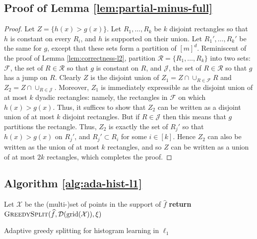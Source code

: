 \documentclass[final,12pt]{colt2018} %
\newcommand{\rect}{\mathcal{R}}
\newcommand{\hier}{\mathcal{D}}
\newcommand{\calF}{\mathcal{F}}
\newcommand{\calJ}{\mathcal{J}}
\newcommand{\calX}{\mathcal{X}}
\newcommand{\fhat}{\widehat{f}}
\newcommand{\grid}{\mathrm{grid}}
\begin{document}
\subsection{Proof of Lemma \ref{lem:partial-minus-full}}
\begin{proof}
Let $Z = \{h(x) > g(x)\}$.
Let $R_1, \ldots, R_k$ be $k$ disjoint rectangles so that $h$ is constant on every $R_i$, and $h$ is supported on their union.
Let $R_1', \ldots, R_k'$ be the same for $g$, except that these sets form a partition of $[m]^d$.
Reminiscent of the proof of Lemma \ref{lem:correctness-l2}, partition $\rect = \{R_1, \ldots, R_k \}$ into two sets: $\calF$, the set of $R \in \rect$ so that $g$ is constant on $R$, and $\calJ$, the set of $R \in \rect$ so that $g$ has a jump on $R$.
Clearly $Z$ is the disjoint union of $Z_1 = Z \cap \cup_{R \in \calF} R$ and $Z_2 = Z \cap \cup_{R \in \calJ}$.
Moreover, $Z_1$ is immediately expressible as the disjoint union of at most $k$ dyadic rectangles: namely, the rectangles in $\calF$ on which $h(x) > g(x)$.
Thus, it suffices to show that $Z_2$ can be written as a disjoint union of at most $k$ disjoint rectangles.
But if $R \in \calJ$ then this means that $g$ partitions the rectangle.
Thus, $Z_2$ is exactly the set of $R_j'$ so that $h(x) > g(x)$ on $R_j'$, and $R_j' \subset R_i$ for some $i \in [k]$.
Hence $Z_2$ can also be written as the union of at most $k$ rectangles, and so $Z$ can be written as a union of at most $2k$ rectangles, which completes the proof.
%
\end{proof}

\subsection{Algorithm \ref{alg:ada-hist-l1}}
\begin{algorithm}[htb]
\begin{algorithmic}[1]
\Function{AdaptiveGreedySplit}{$\fhat, \xi$}
\State Let $\calX$ be the (multi-)set of points in the support of $\fhat$
\State \textbf{return} $\textsc{GreedySplit}(\fhat, \hier(\grid (\calX)), \xi)$
\EndFunction
\end{algorithmic}
\caption{Adaptive greedy splitting for histogram learning in $\ell_1$}
\label{alg:ada-hist-l1}
\end{algorithm}
\end{document}
